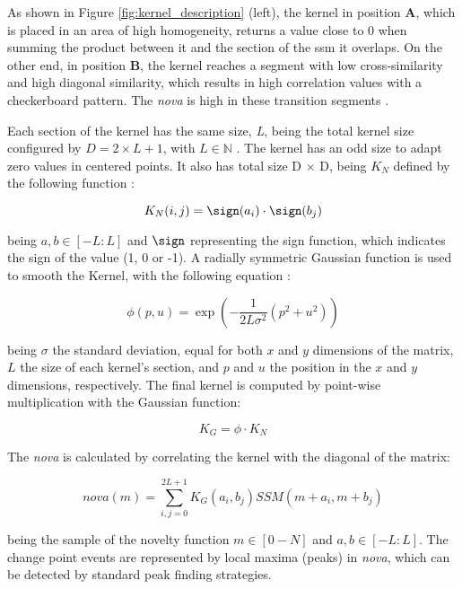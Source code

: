 As shown in Figure \ref{fig:kernel_description} (left), the kernel in position \textbf{A}, which is placed in an area of high homogeneity, returns a value close to $0$ when summing the product between it and the section of the \gls{ssm} it overlaps. On the other end, in position \textbf{B}, the kernel reaches a segment with low cross-similarity and high diagonal similarity, which results in high correlation values with a checkerboard pattern. The \textit{nova} is high in these transition segments \cite{Dannenberg2008, fmp1, fmp2}.
\par
Each section of the kernel has the same size, \textit{L}, being the total kernel size configured by $D = 2 \times L + 1$, with $L \in \mathbb{N}$ . The kernel has an odd size to adapt zero values in centered points. It also has total size D $\times$ D, being $K_{N}$ defined by the following function \cite{fmp1, fmp2}:

\begin{equation}
        K_N(i,j)  = \sign(a_i) \cdot \sign(b_j)
\end{equation}

being $a,b\in[-L:L]$ and $\sign$ representing the sign function, which indicates the sign of the value (1, 0 or -1). A radially symmetric Gaussian function is used to smooth the Kernel, with the following equation \cite{fmp1, fmp2}:

\begin{equation}
    \phi(p,u) = \exp(-\frac{1}{2L\sigma^2}(p^2 + u^2))
\end{equation}

being $\sigma$ the standard deviation, equal for both $x$ and $y$ dimensions of the matrix, $L$ the size of each kernel's section, and $p$ and $u$ the position in the $x$ and $y$ dimensions, respectively. The final kernel is computed by point-wise multiplication with the Gaussian function:

\begin{equation}
    K_{G} = \phi \cdot K_{N}    
\end{equation}

The \textit{nova} is calculated by correlating the kernel with the diagonal of the matrix:

\begin{equation}
    nova(m) = \sum^{2L+1}_{i,j=0} K_{G}(a_i,b_j)SSM(m+a_i, m+b_j)
\end{equation}

being the sample of the novelty function $m \in [0-N]$ and $a, b \in [-L:L]$. The change point events are represented by local maxima (peaks) in \textit{nova}, which can be detected by standard peak finding strategies.

